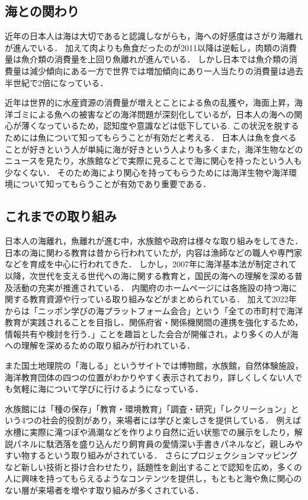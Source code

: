 \documentclass[12pt,a4j,titlepage]{ltjsarticle}
\begin{document}
\subsection{海との関わり}
近年の日本人は海は大切であると認識しながらも，海への好感度はさがり海離れが進んでいる\cite{nihonnzaidann 2024}．
加えて肉よりも魚食だったのが2011以降は逆転し，肉類の消費量は魚介類の消費量を上回り魚離れが進んでいる\cite{suisanntyou suji}．
しかし日本では魚介類の消費量は減少傾向にある一方で世界では増加傾向にあり一人当たりの消費量は過去半世紀で2倍になっている．\par
近年は世界的に水産資源の消費量が増えとことによる魚の乱獲や，海面上昇，海洋ゴミによる魚への被害などの海洋問題が深刻化しているが，日本人の海への関心が薄くなっているため，認知度や意識などは低下している.
この状況を脱するためには魚について知ってもらうことが有効だと考える．
日本人は魚を食べることが好きという人が単純に海が好きという人よりも多くまた，海洋生物などのニュースを見たり，水族館などで実際に見ることで海に関心を持ったという人も少なくない．
そのため海により関心を持ってもらうためには海洋生物や海洋環境について知ってもらうことが有効であり重要である．
\subsection{これまでの取り組み}
日本人の海離れ，魚離れが進む中，水族館や政府は様々な取り組みをしてきた．
日本の海に関わる教育は昔から行われていたが，内容は漁師などの職人や専門家などを育成を中心に行われてきた．
しかし，2007年に海洋基本法が制定されて以降，次世代を支える世代への海に関する教育と，国民の海への理解を深める普及活動の充実が推進されている\cite{kaiyoukaihatu}．
内閣府のホームページには各施設の持つ海に関する教育資源や行っている取り組みなどがまとめられている．
加えて2022年からは「ニッポン学びの海プラットフォーム会合」という「全ての市町村で海洋教育が実践されることを目指し、関係府省・関係機関間の連携を強化するため，情報共有や検討を行う．」\cite{manabitoumi}ことを趣旨とした会合が開催され，より多くの人が海への理解を深めるための取り組みが行われている．\par
また国土地理院の「海しる」というサイトでは博物館，水族館，自然体験施設，海洋教育団体の四つの位置がわかりやすく表示されており，詳しくしくない人でも気軽に海について学びに行けるようになっている．\par
水族館には「種の保存」「教育・環境教育」「調査・研究」「レクリーション」という4つの社会的役割があり，来場者には学びと楽しさを提供している．
例えば水槽に実際に滝つぼや渦潮などを作りより自然に近い状態での展示をしたり，解説パネルに駄洒落を盛り込んだり飼育員の愛情深い手書きパネルなど，親しみやすい物するという取り組みがされている．
さらにプロジェクションマッピングなど新しい技術と掛け合わせたり，話題性を創出することで認知を広め，多くの人に興味を持ってもらえるようなコンテンツを提供し，もともと海や魚に関心のない層が来場者を増やす取り組みが多くされている．
\clearpage
\end{document}
